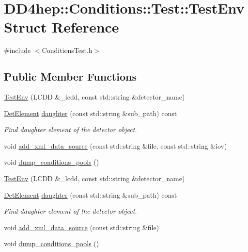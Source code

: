 \hypertarget{struct_d_d4hep_1_1_conditions_1_1_test_1_1_test_env}{
\section{DD4hep::Conditions::Test::TestEnv Struct Reference}
\label{struct_d_d4hep_1_1_conditions_1_1_test_1_1_test_env}
}


{\ttfamily \#include $<$ConditionsTest.h$>$}\subsection*{Public Member Functions}
\begin{DoxyCompactItemize}
\item 
\hyperlink{struct_d_d4hep_1_1_conditions_1_1_test_1_1_test_env_a65ece677c712504466503c346b7c86ec}{TestEnv} (LCDD \&\_\-lcdd, const std::string \&detector\_\-name)
\item 
\hyperlink{namespace_d_d4hep_a21dd977310ff183f61ca6ae14b59a989}{DetElement} \hyperlink{struct_d_d4hep_1_1_conditions_1_1_test_1_1_test_env_a5d42d61e9a0f17ff2ef13bf7f617d27e}{daughter} (const std::string \&sub\_\-path) const 
\begin{DoxyCompactList}\small\item\em Find daughter element of the detector object. \item\end{DoxyCompactList}\item 
void \hyperlink{struct_d_d4hep_1_1_conditions_1_1_test_1_1_test_env_a502ec490ea22819cd94e4c57687b161e}{add\_\-xml\_\-data\_\-source} (const std::string \&file, const std::string \&iov)
\item 
void \hyperlink{struct_d_d4hep_1_1_conditions_1_1_test_1_1_test_env_a2140fd3bd795ea5f7f3fdcb9d3963d9c}{dump\_\-conditions\_\-pools} ()
\item 
\hyperlink{struct_d_d4hep_1_1_conditions_1_1_test_1_1_test_env_a65ece677c712504466503c346b7c86ec}{TestEnv} (LCDD \&\_\-lcdd, const std::string \&detector\_\-name)
\item 
\hyperlink{namespace_d_d4hep_a21dd977310ff183f61ca6ae14b59a989}{DetElement} \hyperlink{struct_d_d4hep_1_1_conditions_1_1_test_1_1_test_env_a5d42d61e9a0f17ff2ef13bf7f617d27e}{daughter} (const std::string \&sub\_\-path) const 
\begin{DoxyCompactList}\small\item\em Find daughter element of the detector object. \item\end{DoxyCompactList}\item 
void \hyperlink{struct_d_d4hep_1_1_conditions_1_1_test_1_1_test_env_acad16b889cd6bbf38177f59e34ec8631}{add\_\-xml\_\-data\_\-source} (const std::string \&file)
\item 
void \hyperlink{struct_d_d4hep_1_1_conditions_1_1_test_1_1_test_env_aa74188c37deebb75495bbdb2964d2228}{dump\_\-conditions\_\-pools} ()
\end{DoxyCompactItemize}
